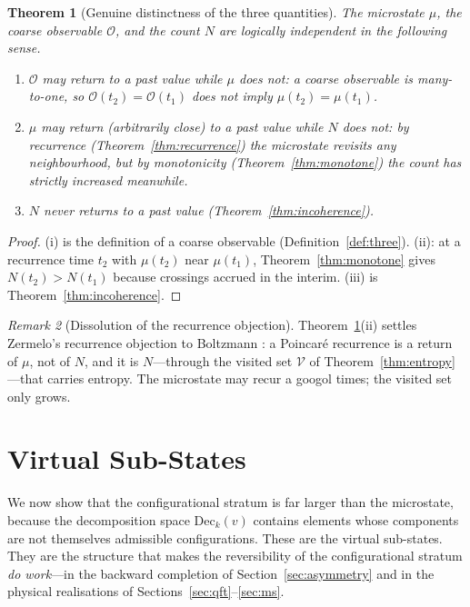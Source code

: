 \documentclass[11pt,a4paper]{article}
\theoremstyle{thmstyle}
\newtheorem{theorem}{Theorem}[section]
\theoremstyle{definition}
\theoremstyle{remark}
\newtheorem{remark}[theorem]{Remark}
\newcommand{\Mic}{\mu}
\newcommand{\Obs}{\mathcal{O}}
\newcommand{\Count}{N}
\newcommand{\Vis}{\mathcal{V}}
\begin{document}
\begin{theorem}[Genuine distinctness of the three quantities]
\label{thm:distinct}
The microstate $\Mic$, the coarse observable $\Obs$, and the count
$\Count$ are logically independent in the following sense.
\begin{enumerate}[label=(\roman*),leftmargin=2em]
\item $\Obs$ may return to a past value while $\Mic$ does not: a coarse
observable is many-to-one, so $\Obs(t_2)=\Obs(t_1)$ does not imply
$\Mic(t_2)=\Mic(t_1)$.
\item $\Mic$ may return (arbitrarily close) to a past value while
$\Count$ does not: by recurrence (Theorem~\ref{thm:recurrence}) the
microstate revisits any neighbourhood, but by monotonicity
(Theorem~\ref{thm:monotone}) the count has strictly increased meanwhile.
\item $\Count$ never returns to a past value (Theorem~\ref{thm:incoherence}).
\end{enumerate}
\end{theorem}

\begin{proof}
(i) is the definition of a coarse observable
(Definition~\ref{def:three}). (ii): at a recurrence time $t_2$ with
$\Mic(t_2)$ near $\Mic(t_1)$, Theorem~\ref{thm:monotone} gives
$\Count(t_2)>\Count(t_1)$ because crossings accrued in the interim. (iii)
is Theorem~\ref{thm:incoherence}.
\end{proof}

\begin{remark}[Dissolution of the recurrence objection]
\label{rem:zermelo}
Theorem~\ref{thm:distinct}(ii) settles Zermelo's recurrence objection to
Boltzmann \citep{zermelo1896,boltzmann1877}: a Poincar\'e recurrence is a
return of $\Mic$, not of $\Count$, and it is $\Count$---through the
visited set $\Vis$ of Theorem~\ref{thm:entropy}---that carries entropy.
The microstate may recur a googol times; the visited set only grows.
\end{remark}

\section{Virtual Sub-States}
\label{sec:virtual}

We now show that the configurational stratum is far larger than the
microstate, because the decomposition space $\mathrm{Dec}_k(v)$ contains
elements whose components are not themselves admissible configurations.
These are the virtual sub-states. They are the structure that makes the
reversibility of the configurational stratum \emph{do work}---in the
backward completion of Section~\ref{sec:asymmetry} and in the physical
realisations of Sections~\ref{sec:qft}--\ref{sec:ms}.
\end{document}
